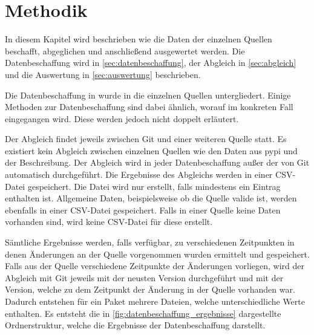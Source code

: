 \chapter{Methodik}
\label{chap:methodik}
In diesem Kapitel wird beschrieben wie die Daten der einzelnen Quellen beschafft, abgeglichen und anschließend ausgewertet werden.
Die Datenbeschaffung wird in \autoref{sec:datenbeschaffung}, der Abgleich in \autoref{sec:abgleich} und die Auswertung in \autoref{sec:auswertung} beschrieben.

Die Datenbeschaffung in wurde in die einzelnen Quellen untergliedert.
Einige Methoden zur Datenbeschaffung sind dabei ähnlich, worauf im konkreten Fall eingegangen wird.
Diese werden jedoch nicht doppelt erläutert.

Der Abgleich findet jeweils zwischen Git und einer weiteren Quelle statt.
Es existiert kein Abgleich zwischen einzelnen Quellen wie den Daten aus \gls{pypi} und der Beschreibung.
Der Abgleich wird in jeder Datenbeschaffung außer der von Git automatisch durchgeführt.
Die Ergebnisse des Abgleichs werden in einer CSV-Datei gespeichert.
Die Datei wird nur erstellt, falls mindestens ein Eintrag enthalten ist.
Allgemeine Daten, beispielsweise ob die Quelle valide ist, werden ebenfalls in einer CSV-Datei gespeichert.
Falls in einer Quelle keine Daten vorhanden sind, wird keine CSV-Datei für diese erstellt.

Sämtliche Ergebnisse werden, falls verfügbar, zu verschiedenen Zeitpunkten in denen Änderungen an der Quelle vorgenommen wurden ermittelt und gespeichert.
Falls aus der Quelle verschiedene Zeitpunkte der Änderungen vorliegen, wird der Abgleich mit Git jeweils mit der neusten Version durchgeführt und mit der Version, welche zu dem Zeitpunkt der Änderung in der Quelle vorhanden war.
Dadurch entstehen für ein Paket mehrere Dateien, welche unterschiedliche Werte enthalten.
Es entsteht die in \autoref{fig:datenbeschaffung_ergebnisse} dargestellte Ordnerstruktur, welche die Ergebnisse der Datenbeschaffung darstellt.

